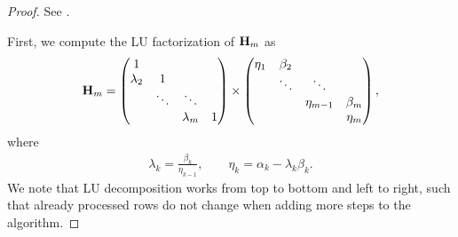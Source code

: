 \begin{proof}
  See \cite[Section 6.7.1]{Saad00}.

  First, we compute the LU factorization of $\mathbf H_m$ as
  \begin{gather}
    \mathbf H_m =
    \begin{pmatrix}
      1\\\lambda_2&1\\
      &\ddots&\ddots\\
      &&\lambda_m&1
    \end{pmatrix}
    \times
    \begin{pmatrix}
      \eta_1&\beta_2\\
      &\ddots&\ddots\\
      &&\eta_{m-1}&\beta_m\\
      &&&\eta_m
    \end{pmatrix},
  \end{gather}
  where
  \begin{gather}
    \lambda_k = \frac{\beta_k}{\eta_{k-1}},
    \qquad
    \eta_k = \alpha_k - \lambda_k \beta_k.
  \end{gather}
  We note that LU decomposition works from top to bottom and left to
  right, such that already processed rows do not change when adding
  more steps to the algorithm.


\end{proof}

